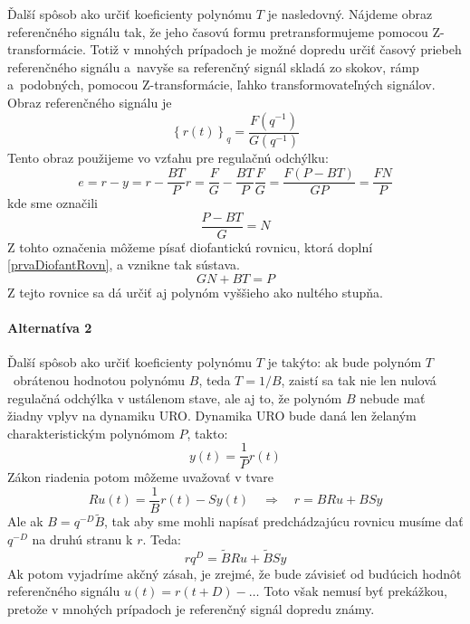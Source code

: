 \documentclass[a4paper, 10pt, ]{article}
\begin{document}
Ďalší spôsob ako určiť koeficienty polynómu $T$ je nasledovný. Nájdeme obraz referenčného signálu tak, že jeho časovú formu pretransformujeme pomocou Z-transformácie. Totiž v mnohých prípadoch je možné dopredu určiť časový priebeh referenčného signálu a~navyše sa referenčný signál skladá zo skokov, rámp a~podobných, pomocou Z-transformácie, ľahko transformovateľných signálov. Obraz referenčného signálu je
\begin{equation}
	\left\{ r(t) \right\}_q = \frac{F \left( q^{-1} \right)}{G \left( q^{-1} \right)}
\end{equation}
Tento obraz použijeme vo vzťahu pre regulačnú odchýlku:
\begin{equation}
	e = r - y = r - \frac{BT}{P}r = \frac{F}{G} - \frac{BT}{P}\frac{F}{G} = \frac{F(P - BT)}{GP} = \frac{FN}{P}
\end{equation}
kde sme označili
\begin{equation}
	\frac{P - BT}{G} = N
\end{equation}
Z tohto označenia môžeme písať diofantickú rovnicu, ktorá doplní \eqref{prvaDiofantRovn}, a vznikne tak sústava.
\begin{equation}
	GN + BT = P
\end{equation}
Z tejto rovnice sa dá určiť aj polynóm vyššieho ako nultého stupňa.



\paragraph{Alternatíva 2}

Ďalší spôsob ako určiť koeficienty polynómu $T$ je takýto: ak bude polynóm $T$~obrátenou hodnotou polynómu $B$, teda $T = 1/B$, zaistí sa tak nie len nulová regulačná odchýlka v ustálenom stave, ale aj to, že polynóm $B$ nebude mať žiadny vplyv na dynamiku URO. Dynamika URO bude daná len želaným charakteristickým polynómom $P$, takto:
\begin{equation}
	y(t) = \frac{1}{P}r(t)
\end{equation}
Zákon riadenia potom môžeme uvažovať v tvare
\begin{equation}
	Ru(t) = \frac{1}{B}r(t) - Sy(t) \quad \Rightarrow \quad r = BRu + BSy
\end{equation}
Ale ak $B = q^{-D}\tilde{B}$, tak aby sme mohli napísať predchádzajúcu rovnicu musíme dať $q^{-D}$ na druhú stranu k $r$. Teda:
\begin{equation}
	 rq^{D} = \tilde{B}Ru + \tilde{B}Sy
\end{equation}
Ak potom vyjadríme akčný zásah, je zrejmé, že bude závisieť od budúcich hodnôt referenčného signálu $u(t) = r(t + D)-\ldots$ Toto však nemusí byť prekážkou, pretože v mnohých prípadoch je referenčný signál dopredu známy.
\end{document}
